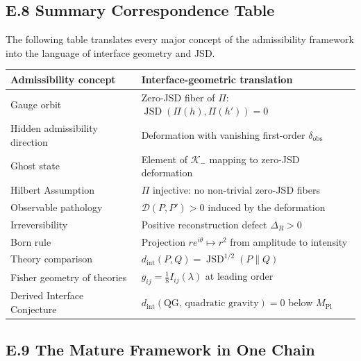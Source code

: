 \documentclass[12pt,a4paper]{article}
\theoremstyle{remark}
\begin{document}
\subsection*{E.8 Summary Correspondence Table}

The following table translates every major concept of the admissibility
framework into the language of interface geometry and JSD.

\medskip
{\small
\begin{center}
\begin{tabular}{p{3.8cm}p{5.8cm}}
\toprule
Admissibility concept & Interface-geometric translation \\
\midrule
Gauge orbit &
Zero-JSD fiber of $\Pi$: $\operatorname{JSD}(\Pi(h), \Pi(h')) = 0$ \\
Hidden admissibility direction &
Deformation with vanishing first-order $\delta_{\mathrm{obs}}$ \\
Ghost state &
Element of $\mathcal{K}_-$ mapping to zero-JSD deformation \\
Hilbert Assumption &
$\Pi$ injective: no non-trivial zero-JSD fibers \\
Observable pathology &
$\mathcal{D}(P, P') > 0$ induced by the deformation \\
Irreversibility &
Positive reconstruction defect $\Delta_R > 0$ \\
Born rule &
Projection $re^{i\theta} \mapsto r^2$ from amplitude to intensity \\
Theory comparison &
$d_{\mathrm{int}}(P, Q) = \operatorname{JSD}^{1/2}(P \| Q)$ \\
Fisher geometry of theories &
$g_{ij} = \frac{1}{8} I_{ij}(\lambda)$ at leading order \\
Derived Interface Conjecture &
$d_{\mathrm{int}}(\text{QG},\, \text{quadratic gravity}) = 0$ below $M_{\mathrm{Pl}}$ \\
\bottomrule
\end{tabular}
\end{center}}
\medskip

\subsection*{E.9 The Mature Framework in One Chain}
\end{document}
